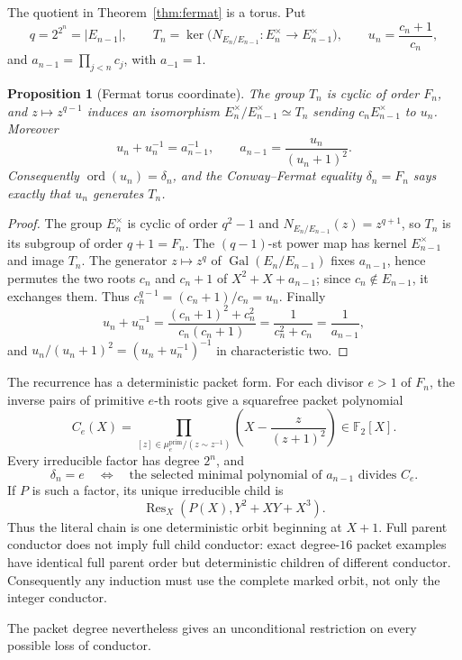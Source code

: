 \documentclass[11pt]{article}
\newtheorem{proposition}[theorem]{Proposition}
\theoremstyle{definition}
\theoremstyle{remark}
\begin{document}
The quotient in Theorem~\ref{thm:fermat} is a torus.  Put
\[
 q=2^{2^n}=|E_{n-1}|,\qquad
 T_n=\ker\bigl(N_{E_n/E_{n-1}}\colon E_n^{\times}\to E_{n-1}^{\times}\bigr),
 \qquad
 u_n=\frac{c_n+1}{c_n},
\]
and $a_{n-1}=\prod_{j<n}c_j$, with $a_{-1}=1$.

\begin{proposition}[Fermat torus coordinate]\label{prop:z-torus}
The group $T_n$ is cyclic of order $F_n$, and $z\mapsto z^{q-1}$ induces an
isomorphism $E_n^{\times}/E_{n-1}^{\times}\simeq T_n$ sending
$c_nE_{n-1}^{\times}$ to $u_n$.  Moreover
\[
 u_n+u_n^{-1}=a_{n-1}^{-1},
 \qquad
 a_{n-1}=\frac{u_n}{(u_n+1)^2}.
\]
Consequently $\operatorname{ord}(u_n)=\delta_n$, and the Conway--Fermat
equality $\delta_n=F_n$ says exactly that $u_n$ generates $T_n$.
\end{proposition}

\begin{proof}
The group $E_n^{\times}$ is cyclic of order $q^2-1$ and
$N_{E_n/E_{n-1}}(z)=z^{q+1}$, so $T_n$ is its subgroup of order $q+1=F_n$.
The $(q-1)$-st power map has kernel $E_{n-1}^{\times}$ and image $T_n$.  The
generator $z\mapsto z^q$ of $\operatorname{Gal}(E_n/E_{n-1})$ fixes
$a_{n-1}$, hence permutes the two roots $c_n$ and $c_n+1$ of
$X^2+X+a_{n-1}$; since $c_n\notin E_{n-1}$, it exchanges them.  Thus
$c_n^{q-1}=(c_n+1)/c_n=u_n$.  Finally
\[
 u_n+u_n^{-1}=\frac{(c_n+1)^2+c_n^2}{c_n(c_n+1)}
 =\frac1{c_n^2+c_n}=\frac1{a_{n-1}},
\]
and $u_n/(u_n+1)^2=(u_n+u_n^{-1})^{-1}$ in characteristic two.
\end{proof}

The recurrence has a deterministic packet form.  For each divisor $e>1$ of
$F_n$,
the inverse pairs of primitive $e$-th roots give a squarefree packet
polynomial
\[
 C_e(X)=
 \prod_{[z]\in\mu_e^{\mathrm{prim}}/(z\sim z^{-1})}
 \left(X-\frac{z}{(z+1)^2}\right)\in\mathbb F_2[X].
\]
Every irreducible factor has degree $2^n$, and
\[
 \delta_n=e
 \quad\Longleftrightarrow\quad
 \text{the selected minimal polynomial of $a_{n-1}$ divides $C_e$}.
\]
If $P$ is such a factor, its unique irreducible child is
\[
 \operatorname{Res}_X(P(X),Y^2+XY+X^3).
\]
Thus the literal chain is one deterministic orbit beginning at $X+1$.
Full parent conductor does not imply full child conductor: exact degree-$16$
packet examples have identical full parent order but deterministic children
of different conductor.  Consequently any induction must use the complete
marked orbit, not only the integer conductor.

The packet degree nevertheless gives an unconditional restriction on every
possible loss of conductor.
\end{document}

